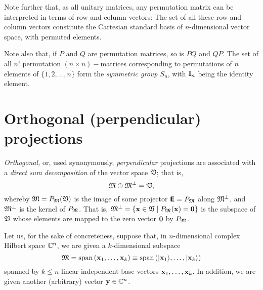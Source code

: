 Note further that, as all unitary matrices, any permutation matrix can be interpreted in terms of row and column vectors:
The set of all these row and column vectors constitute the Cartesian standard basis of $n$-dimensional vector space,
with permuted elements.

Note also that, if $P$ and $Q$ are permutation matrices, so is $PQ$ and $QP$.
The set of all $n!$
permutation $(n\times n)-$matrices corresponding to permutations of $n$ elements of $\{ 1,2,\ldots ,n\}$ form the
{\em symmetric group $S_n$}, with ${\Bbb I}_n$ being the identity element.





\section{Orthogonal (perpendicular) projections}

{\em Orthogonal,} or, used synonymously,
{\em perpendicular} projections
are associated with a {\em direct sum decomposition} of the vector space ${\frak V}$;
that is,
\begin{equation}
 {\frak M}\oplus {\frak M}^\perp ={\frak V},
\label{2012-m-ch-fdvs-perp}
\end{equation}
whereby $ {\frak M}= P_{\frak M}({\frak V})$
is the image of some projector $\textsf{\textbf{E}}=P_{\frak M}$
along ${\frak M}^\perp$, and  ${\frak M}^\perp$ is
the kernel of $P_{\frak M}$.
That is, ${\frak M}^\perp = \left\{{\bf x} \in {\frak V} \mid P_{\frak M}({\bf x}) = {\bf 0}\right\}$
is the subspace of ${\frak V}$
whose elements are mapped to the zero vector ${\bf 0}$ by $P_{\frak M}$.


Let us, for the sake of concreteness,
suppose that, in $n$-dimensional complex Hilbert space
${\Bbb C}^n$, we are given a $k$-dimensional subspace
\begin{equation}
{\frak M} = \textrm{span}\left( {\bf x}_1,\ldots ,{\bf x}_k \right)
\equiv \textrm{span}\left(\vert {\bf x}_1\rangle ,\ldots ,\vert {\bf x}_k \right\rangle )
\end{equation}
spanned
by  $k \le n$  linear independent base vectors ${\bf x}_1,\ldots ,{\bf x}_k$.
In addition, we are given another (arbitrary) vector ${\bf y} \in {\Bbb C}^n$.

